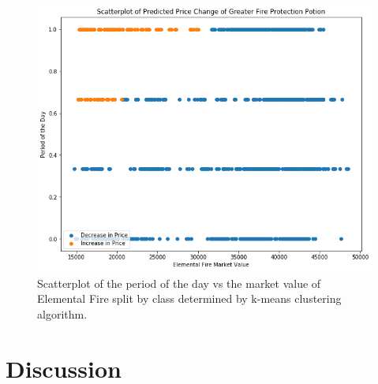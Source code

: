 \documentclass[sigconf]{acmart}
\begin{document}
\begin{figure}[h]
\centering
\includegraphics[width=\linewidth]{cluster_plot}
\caption{Scatterplot of the period of the day vs the market value of Elemental Fire split by class determined by k-means clustering algorithm.}
\end{figure}


\section{Discussion}
\end{document}
